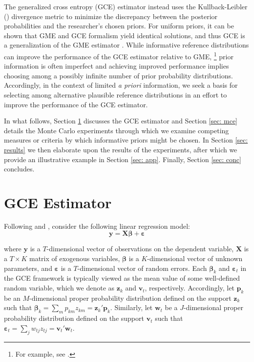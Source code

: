\documentclass[english]{article}
\begin{document}
The generalized cross entropy (GCE) estimator instead uses the 
Kullback-Leibler (\citeyear{kullback1951}) divergence metric to minimize the 
discrepancy between the posterior probabilities and the researcher's chosen 
priors.
For uniform priors, it can be shown that GME and GCE formalism yield
identical solutions, and thus GCE is a generalization of the GME estimator
\citep{golan1996}.
While informative reference distributions can improve the performance of 
the GCE estimator relative to GME,%
\footnote{For example, see \citet{heckelei2003}.}
prior information is often imperfect and achieving improved performance 
implies choosing among a possibly infinite number of prior probability 
distributions.
Accordingly, in the context of limited \textit{a priori} information, 
we seek a basis for selecting among alternative plausible reference 
distributions in an effort to improve the performance of the GCE 
estimator. 

In what follows, Section \ref{sec: gce} discusses the GCE estimator and 
Section \ref{sec: mce} details the Monte Carlo experiments through which 
we examine competing measures or criteria by which informative priors might 
be chosen.
In Section \ref{sec: results} we then elaborate upon the results of the 
experiments, after which we provide an illustrative example in Section 
\ref{sec: app}.
Finally, Section \ref{sec: conc} concludes. 



\section{GCE Estimator}
\label{sec: gce}

Following \cite{golan1996} and \citet{golan2008}, consider the following 
linear regression model: 
\begin{equation}
\mathbf{y} = \mathbf{X\beta} + \mathbf{\varepsilon}
\end{equation}

\noindent
where $\mathbf{y}$ is a $T$-dimensional vector of observations on the 
dependent variable, $\mathbf{X}$ is a $T\times K$ matrix of exogenous
variables, $\mathbf{\beta}$ is a $K$-dimensional vector of unknown 
parameters, and $\mathbf{\varepsilon}$ is a $T$-dimensional vector of 
random errors.
Each $\mathbf{\beta}_k$ and $\mathbf{\varepsilon}_t$ in the GCE 
framework is typically viewed as the mean value of some well-defined 
random variable, which we denote as $\mathbf{z}_k$ and $\mathbf{v}_t$, 
respectively.
Accordingly, let $\mathbf{p}_k$ be an $M$-dimensional proper 
probability distribution defined on the support $\mathbf{z}_k$ such that 
$\mathbf{\beta}_k = \sum_m p_{km}z_{km} = \mathbf{z}_k' 
\mathbf{p}_k$.
Similarly, let $\mathbf{w}_t$ be a $J$-dimensional proper probability 
distribution defined on the support $\mathbf{v}_t$ such that  
$\mathbf{\varepsilon}_t = \sum_j w_{tj}z_{tj} = \mathbf{v}_t' 
\mathbf{w}_t$.
\end{document}
